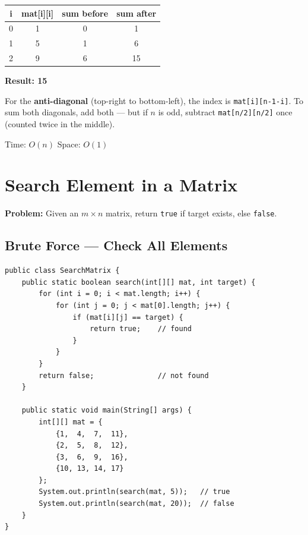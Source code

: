 \documentclass[12pt,a4paper,oneside]{book}
\begin{document}
\begin{dryrun}[arr = \{\{1,2,3\},\{4,5,6\},\{7,8,9\}\}]
\begin{center}
\begin{tabular}{cccc}
\toprule
\textbf{i} & \textbf{mat[i][i]} & \textbf{sum before} & \textbf{sum after}\\
\midrule
0 & 1 & 0  & 1\\
1 & 5 & 1  & 6\\
2 & 9 & 6  & 15\\
\bottomrule
\end{tabular}
\end{center}
\textbf{Result: 15}
\end{dryrun}

\begin{tipbox}
For the \textbf{anti-diagonal} (top-right to bottom-left), the index is \texttt{mat[i][n-1-i]}. To sum both diagonals, add both --- but if $n$ is odd, subtract \texttt{mat[n/2][n/2]} once (counted twice in the middle).
\end{tipbox}

\begin{complexity}
Time: $O(n)$ \quad Space: $O(1)$
\end{complexity}

\section{Search Element in a Matrix}

\textbf{Problem:} Given an $m \times n$ matrix, return \texttt{true} if target exists, else \texttt{false}.

\subsection{Brute Force --- Check All Elements}

\begin{lstlisting}[caption={Search in Matrix --- Brute Force O(m*n)}]
public class SearchMatrix {
    public static boolean search(int[][] mat, int target) {
        for (int i = 0; i < mat.length; i++) {
            for (int j = 0; j < mat[0].length; j++) {
                if (mat[i][j] == target) {
                    return true;    // found
                }
            }
        }
        return false;               // not found
    }

    public static void main(String[] args) {
        int[][] mat = {
            {1,  4,  7,  11},
            {2,  5,  8,  12},
            {3,  6,  9,  16},
            {10, 13, 14, 17}
        };
        System.out.println(search(mat, 5));   // true
        System.out.println(search(mat, 20));  // false
    }
}
\end{lstlisting}
\end{document}

